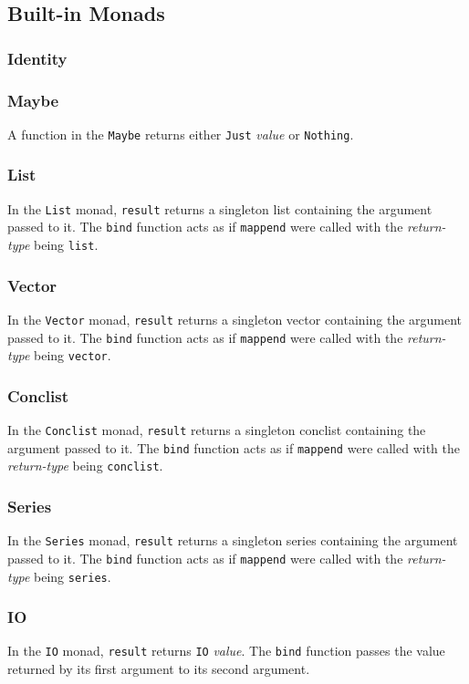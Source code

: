 \documentclass[10pt]{book}
\begin{document}
\subsection{Built-in Monads}
\subsubsection{Identity}
\subsubsection{Maybe}
A function in the \texttt{Maybe} returns either \texttt{Just} \textit{value} or \texttt{Nothing}.
\subsubsection{List}
In the \texttt{List} monad, \texttt{result} returns a singleton list containing the argument passed to it. The \texttt{bind} function acts as if \texttt{mappend} were called with the \textit{return-type} being \texttt{list}.
\subsubsection{Vector}
In the \texttt{Vector} monad, \texttt{result} returns a singleton vector containing the argument passed to it. The \texttt{bind} function acts as if \texttt{mappend} were called with the \textit{return-type} being \texttt{vector}.
\subsubsection{Conclist}
In the \texttt{Conclist} monad, \texttt{result} returns a singleton conclist containing the argument passed to it. The \texttt{bind} function acts as if \texttt{mappend} were called with the \textit{return-type} being \texttt{conclist}.
\subsubsection{Series}
In the \texttt{Series} monad, \texttt{result} returns a singleton series containing the argument passed to it. The \texttt{bind} function acts as if \texttt{mappend} were called with the \textit{return-type} being \texttt{series}.
\subsubsection{IO}
In the \texttt{IO} monad, \texttt{result} returns \texttt{IO} \textit{value}. The \texttt{bind} function passes the value returned by its first argument to its second argument.
\end{document}

